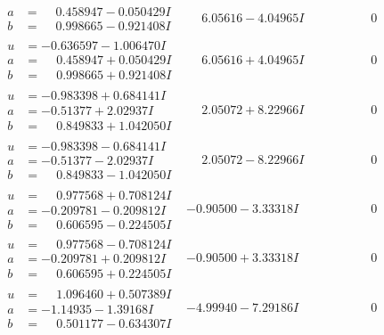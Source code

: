 \documentclass[1p]{elsarticle_modified}
\theoremstyle{definition}
\begin{document}
$$\begin{array}{c|c|c}
\begin{aligned}
a &= \phantom{-}0.458947 - 0.050429 I \\
b &= \phantom{-}0.998665 - 0.921408 I\end{aligned}
 & \phantom{-}6.05616 - 4.04965 I & \phantom{-0.000000 } 0 \\ \hline\begin{aligned}
u &= -0.636597 - 1.006470 I \\
a &= \phantom{-}0.458947 + 0.050429 I \\
b &= \phantom{-}0.998665 + 0.921408 I\end{aligned}
 & \phantom{-}6.05616 + 4.04965 I & \phantom{-0.000000 } 0 \\ \hline\begin{aligned}
u &= -0.983398 + 0.684141 I \\
a &= -0.51377 + 2.02937 I \\
b &= \phantom{-}0.849833 + 1.042050 I\end{aligned}
 & \phantom{-}2.05072 + 8.22966 I & \phantom{-0.000000 } 0 \\ \hline\begin{aligned}
u &= -0.983398 - 0.684141 I \\
a &= -0.51377 - 2.02937 I \\
b &= \phantom{-}0.849833 - 1.042050 I\end{aligned}
 & \phantom{-}2.05072 - 8.22966 I & \phantom{-0.000000 } 0 \\ \hline\begin{aligned}
u &= \phantom{-}0.977568 + 0.708124 I \\
a &= -0.209781 - 0.209812 I \\
b &= \phantom{-}0.606595 - 0.224505 I\end{aligned}
 & -0.90500 - 3.33318 I & \phantom{-0.000000 } 0 \\ \hline\begin{aligned}
u &= \phantom{-}0.977568 - 0.708124 I \\
a &= -0.209781 + 0.209812 I \\
b &= \phantom{-}0.606595 + 0.224505 I\end{aligned}
 & -0.90500 + 3.33318 I & \phantom{-0.000000 } 0 \\ \hline\begin{aligned}
u &= \phantom{-}1.096460 + 0.507389 I \\
a &= -1.14935 - 1.39168 I \\
b &= \phantom{-}0.501177 - 0.634307 I\end{aligned}
 & -4.99940 - 7.29186 I & \phantom{-0.000000 } 0 \\ \hline\begin{aligned}

\end{aligned}
\end{array}$$
\end{document}
